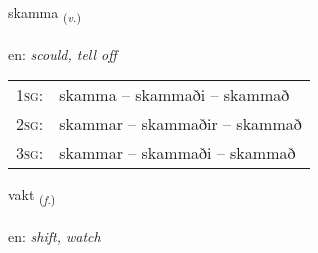\documentclass[frontgrid, backgrid]{flacards}\usepackage[]{graphicx}\usepackage[]{xcolor}
\begin{document}
\renewcommand{\flhead}{\vskip5pt \fboxsep=0pt {\small\bfseries\footnotesize Sagnorð | Verb}}
\renewcommand{\fcfoot}{\vskip5pt \fboxsep=0pt \hspace{2pt}{\small\bfseries\footnotesize 3K}}

\renewcommand{\blhead}{\vskip5pt {\small\bfseries\footnotesize Sagnorð | Verb }}
\renewcommand{\bcfoot}{\vskip5pt \hspace{2pt}{\small\bfseries\footnotesize 3K}}


{skamma \small{\textsubscript{(\textit{v.})}} \\[1ex] %
\textphonetic{[skama]} \\
en: \emph{scould, tell off} \\  [2ex]
\renewcommand*{\arraystretch}{0.8}
\begin{tabular}{p{1cm}l}
\textsc{1sg}: & skamma -- skammaði -- skammað \\ 
\textsc{2sg}: & skammar -- skammaðir -- skammað \\ 
\textsc{3sg}: & skammar -- skammaði -- skammað \\ 
\end{tabular}
}

\renewcommand{\flhead}{\vskip5pt \fboxsep=0pt {\small\bfseries\footnotesize Nafnorð | Noun}}
\renewcommand{\fcfoot}{\vskip5pt \fboxsep=0pt \hspace{2pt}{\small\bfseries\footnotesize 3K}}

\renewcommand{\blhead}{\vskip5pt {\small\bfseries\footnotesize Nafnorð | Noun }}
\renewcommand{\bcfoot}{\vskip5pt \hspace{2pt}{\small\bfseries\footnotesize 3K}}


{vakt \small{\textsubscript{(\textit{f.})}} \\[1ex] %
\textphonetic{[vaxt]} \\
en: \emph{shift, watch} \\  [2ex]
\renewcommand*{\arraystretch}{0.8}
}
\end{document}
